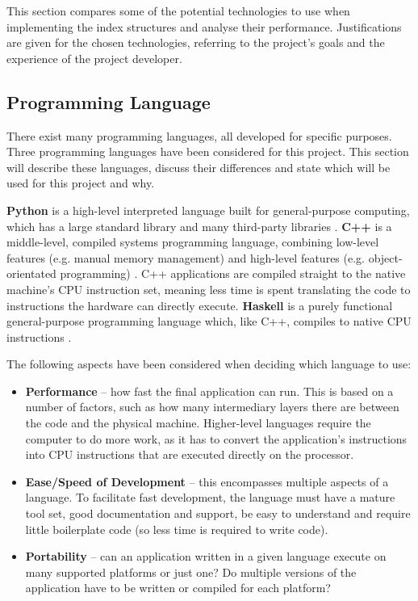 This section compares some of the potential technologies to use when implementing the index structures and analyse their performance. Justifications are given for the chosen technologies, referring to the project's goals and the experience of the project developer.

\subsection{Programming Language}

There exist many programming languages, all developed for specific purposes. Three programming languages have been considered for this project. This section will describe these languages, discuss their differences and state which will be used for this project and why.

\textbf{Python} is a high-level interpreted language built for general-purpose computing, which has a large standard library and many third-party libraries \cite{python}. \textbf{C++} is a middle-level, compiled systems programming language, combining low-level features (e.g. manual memory management) and high-level features (e.g. object-orientated programming) \cite{cpp}. C++ applications are compiled straight to the native machine's CPU instruction set, meaning less time is spent translating the code to instructions the hardware can directly execute. \textbf{Haskell} is a purely functional general-purpose programming language which, like C++, compiles to native CPU instructions \cite{haskell}.

The following aspects have been considered when deciding which language to use:
\begin{itemize}
	\item \textbf{Performance} -- how fast the final application can run. This is based on a number of factors, such as how many intermediary layers there are between the code and the physical machine. Higher-level languages require the computer to do more work, as it has to convert the application's instructions into CPU instructions that are executed directly on the processor.
	\item \textbf{Ease/Speed of Development} -- this encompasses multiple aspects of a language. To facilitate fast development, the language must have a mature tool set, good  documentation and support, be easy to understand and require little boilerplate code (so less time is required to write code).
	\item \textbf{Portability} -- can an application written in a given language execute on many supported platforms or just one? Do multiple versions of the application have to be written or compiled for each platform?
\end{itemize}
 
